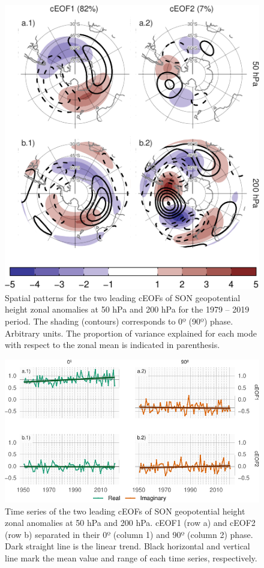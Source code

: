 \documentclass[pdflatex,lineno,sn-basic]{sn-jnl}
\theoremstyle{thmstyleone}%
\theoremstyle{thmstyletwo}%
\theoremstyle{thmstylethree}%
\begin{document}
\begin{figure}
\centering
\includegraphics{shceof_files/figure-latex/ceofs-1-1.pdf}
\caption{\label{fig:ceofs-1}Spatial patterns for the two leading cEOFs of SON geopotential height zonal anomalies at 50 hPa and 200 hPa for the 1979 -- 2019 period. The shading (contours) corresponds to 0º (90º) phase. Arbitrary units. The proportion of variance explained for each mode with respect to the zonal mean is indicated in parenthesis.}
\end{figure}



\begin{figure}
\includegraphics{shceof_files/figure-latex/extended-series-1} \caption{Time series of the two leading cEOFs of SON geopotential height zonal anomalies at 50 hPa and 200 hPa. cEOF1 (row a) and cEOF2 (row b) separated in their 0º (column 1) and 90º (column 2) phase. Dark straight line is the linear trend. Black horizontal and vertical line mark the mean value and range of each time series, respectively.}\label{fig:extended-series}
\end{figure}
\end{document}
